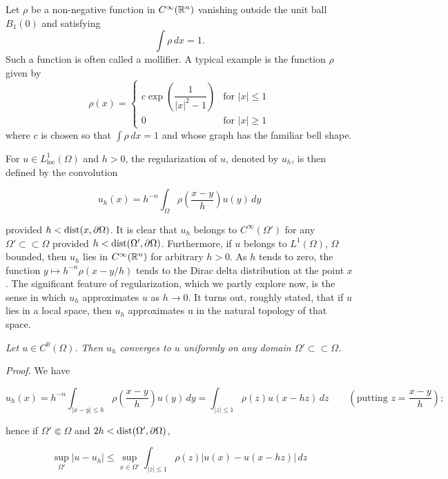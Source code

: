 Let $\rho$ be a non-negative function in $C^\infty(\mathbb{R}^n)$ vanishing outside the unit ball $B_1(0)$ and satisfying
\[
\int \rho\,dx = 1.
\]
Such a function is often called a mollifier. A typical example is the function $\rho$ given by
\[
\rho(x)=
\begin{cases}
c \exp\!\left(\dfrac{1}{|x|^2-1}\right) & \text{for } |x|\le 1 \\
0 & \text{for } |x|\ge 1
\end{cases}
\]
where $c$ is chosen so that $\int \rho\,dx = 1$ and whose graph has the familiar bell shape.

For $u\in L^1_{\mathrm{loc}}(\Omega)$ and $h>0$, the regularization of $u$, denoted by $u_h$, is then defined by the convolution

\[
\tag{7.13}
u_h(x)=h^{-n}\int_{\Omega}\rho\!\left(\frac{x-y}{h}\right)u(y)\,dy
\]

provided $h<\operatorname{dist}(x,\partial\Omega)$. It is clear that $u_h$ belongs to $C^\infty(\Omega')$ for any $\Omega' \subset\subset \Omega$ provided $h<\operatorname{dist}(\Omega',\partial\Omega)$. Furthermore, if $u$ belongs to $L^1(\Omega)$, $\Omega$ bounded, then $u_h$ lies in $C^\infty(\mathbb{R}^n)$ for arbitrary $h>0$. As $h$ tends to zero, the function $y\mapsto h^{-n}\rho(x-y/h)$ tends to the Dirac delta distribution at the point $x$. The significant feature of regularization, which we partly explore now, is the sense in which $u_h$ approximates $u$ as $h\to 0$. It turns out, roughly stated, that if $u$ lies in a local space, then $u_h$ approximates u in the natural topology of that space.

\begin{lemma}\label{gt:lem-sobolev-regularization-uniform}
\emph{Let $u\in C^0(\Omega)$. Then $u_h$ converges to $u$ uniformly on any domain $\Omega' \subset\subset \Omega$.}
\end{lemma}



\textit{Proof.} We have

\[
u_h(x)=h^{-n}\int_{|x-y|\le h}\rho\!\left(\frac{x-y}{h}\right)u(y)\,dy
=\int_{|z|\le 1}\rho(z)u(x-hz)\,dz
\qquad \left(\text{putting } z=\frac{x-y}{h}\right);
\]

hence if $\Omega' \Subset \Omega$ and $2h<\operatorname{dist}(\Omega',\partial\Omega)$,

\[
\sup_{\Omega'}|u-u_h|
\le \sup_{x\in\Omega'}\int_{|z|\le 1}\rho(z)\lvert u(x)-u(x-hz)\rvert\,dz
\]


